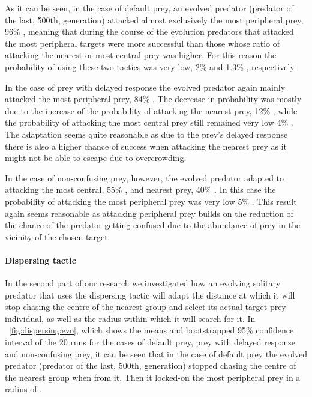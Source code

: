 As it can be seen, in the case of default prey, an evolved predator (predator of the last, 500th, generation) attacked almost exclusively the most peripheral prey, 96\% , meaning that during the course of the evolution predators that attacked the most peripheral targets were more successful than those whose ratio of attacking the nearest or most central prey was higher. For this reason the probability of using these two tactics was very low, 2\%  and \num{1.3}\% , respectively.

In the case of prey with delayed response the evolved predator again mainly attacked the most peripheral prey, 84\% . The decrease in probability was mostly due to the increase of the probability of attacking the nearest prey, 12\% , while the probability of attacking the most central prey still remained very low 4\% . The adaptation seems quite reasonable as due to the prey's delayed response there is also a higher chance of success when attacking the nearest prey as it might not be able to escape due to overcrowding.

In the case of non-confusing prey, however, the evolved predator adapted to attacking the most central, 55\% , and nearest prey, 40\% . In this case the probability of attacking the most peripheral prey was very low 5\% . This result again seems reasonable as attacking peripheral prey builds on the reduction of the chance of the predator getting confused due to the abundance of prey in the vicinity of the chosen target.

\paragraph{Dispersing tactic} In the second part of our research we investigated how an evol\-ving solitary predator that uses the dispersing tactic will adapt the distance at which it will stop chasing the centre of the nearest group and select its actual target prey individual, as well as the radius within which it will search for it. In \figurename~\ref{fig:dispersing:evo}, which shows the means and bootstrapped 95\% confidence interval of the 20 runs for the cases of default prey, prey with delayed response and non-confusing prey, it can be seen that in the case of default prey the evolved predator (predator of the last, 500th, generation) stopped chasing the centre of the nearest group when   from it. Then it locked-on the most peripheral prey in a radius of  .

